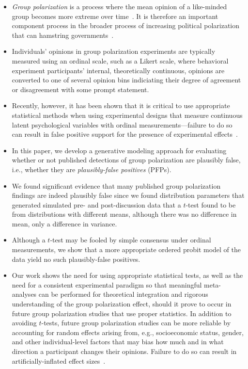 \documentclass[11pt, letterpaper]{article}
\begin{document}
\begin{itemize}
  \item 
    \emph{Group polarization} is a process where the mean opinion of a 
    like-minded group becomes more extreme over time~\cite{Brown1986,Brown2000}. 
    It is therefore an important component process in
    the broader process of increasing political polarization that can hamstring
    governments~\cite{Mason2018UncivilAgreementBook,Klein2020}.
  \item
    Individuals' opinions in group polarization experiments are typically 
    measured using an ordinal scale, such
    as a Likert scale, where behavioral experiment participants' internal, theoretically
    continuous, opinions are converted to one of several opinion bins indiciating
    their degree of agreement or disagreement with some prompt statement.
  \item
    Recently, however, it has been shown that it is critical to use 
    appropriate statistical methods when using experimental designs that 
    measure continuous latent psychological variables with ordinal
    measurements---failure to do so can result in false positive support for
    the presence of experimental effects~\cite{Liddell2018}.
  \item
    In this paper, we develop a generative modeling approach for evaluating whether or
    not published detections of group polarization are plausibly false, i.e.,
    whether they are \emph{plausibly-false positives} (PFPs). 
  \item
    We found significant evidence that many published group polarization findings
    are indeed plausibly false since we found distribution parameters that
    generated simulated pre- and post-discussion data that a $t$-test found
    to be from distributions with different means, although there was no difference
    in mean, only a difference in variance. 
  \item
    Although a $t$-test may be fooled by simple consensus under ordinal measurements,
    we show that a more appropriate ordered probit model of the data yield no
    such plausibly-false positives.
  \item
    Our work shows the need for using appropriate statistical tests, as well as
    the need for a consistent experimental paradigm so that meaningful meta-analyses
    can be performed for theoretical integration and rigorous understanding of
    the group polarization effect, should it prove to occur in future group
    polarization studies that use proper statistics. In addition to avoiding
    $t$-tests, future group polarization studies can be more reliable by
    accounting for random effects arising from, e.g., socioeconomic status,
    gender, and other individual-level factors that may bias how much and in what
    direction a participant changes their opinions. Failure to do so can result 
    in artificially-inflated effect sizes~\cite{Yarkoni2021}.
\end{itemize}
\end{document}
